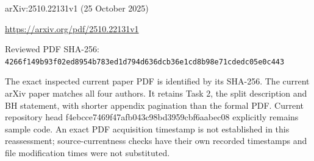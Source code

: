 \documentclass[11pt]{article}
\begin{document}
arXiv:2510.22131v1 (25 October 2025)

\url{https://arxiv.org/pdf/2510.22131v1}

Reviewed PDF SHA-256: \nolinkurl{4266f149b93f02ed8954b783ed1d794d636dcb36e1cd8b98e71cdedc05e0c443}

The exact inspected current paper PDF is identified by its SHA-256. The current arXiv paper matches all four authors. It retains Task 2, the split description and BH statement, with shorter appendix pagination than the formal PDF. Current repository head f4ebcce7469f47afb043c98bd3959cbf6aabec08 explicitly remains sample code. An exact PDF acquisition timestamp is not established in this reassessment; source-currentness checks have their own recorded timestamps and file modification times were not substituted.
\end{document}
